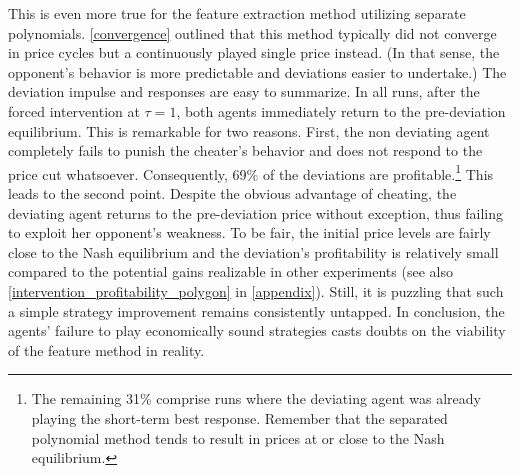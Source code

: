 This is even more true for the feature extraction method utilizing separate polynomials. \autoref{convergence} outlined that this method typically did not converge in price cycles but a continuously played single price instead. (In that sense, the opponent's behavior is more predictable and deviations easier to undertake.) The deviation impulse and responses are easy to summarize. In all runs, after the forced intervention at $\tau = 1$, both agents immediately return to the pre-deviation equilibrium. This is remarkable for two reasons. First, the non deviating agent completely fails to punish the cheater's behavior and does not respond to the price cut whatsoever. Consequently, 69\% of the deviations are profitable.\footnote{The remaining 31\% comprise runs where the deviating agent was already playing the short-term best response. Remember that the separated polynomial method tends to result in prices at or close to the Nash equilibrium.} This leads to the second point. Despite the obvious advantage of cheating, the deviating agent returns to the pre-deviation price without exception, thus failing to exploit her opponent's weakness. To be fair, the initial price levels are fairly close to the Nash equilibrium and the deviation's profitability is relatively small compared to the potential gains realizable in other experiments (see also \autoref{intervention_profitability_polygon} in \autoref{appendix}). Still, it is puzzling that such a simple strategy improvement remains consistently untapped. In conclusion, the agents' failure to play economically sound strategies casts doubts on the viability of the feature method in reality.

